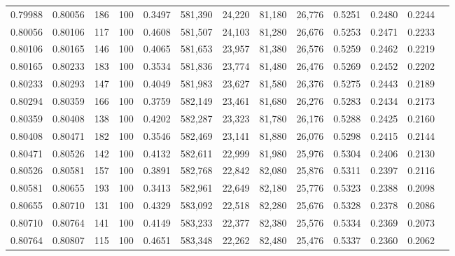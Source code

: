 \begin{tabular}{rrrrrrrrrrrrr}
0.79988 & 0.80056 &   186 & 100 &                                     0.3497 & 581,390 &  24,220 &  81,180 &  26,776 & 0.5251 & 0.2480 & 0.2244 \\
0.80056 & 0.80106 &   117 & 100 &                                     0.4608 & 581,507 &  24,103 &  81,280 &  26,676 & 0.5253 & 0.2471 & 0.2233 \\
0.80106 & 0.80165 &   146 & 100 &                                     0.4065 & 581,653 &  23,957 &  81,380 &  26,576 & 0.5259 & 0.2462 & 0.2219 \\
0.80165 & 0.80233 &   183 & 100 &                                     0.3534 & 581,836 &  23,774 &  81,480 &  26,476 & 0.5269 & 0.2452 & 0.2202 \\
0.80233 & 0.80293 &   147 & 100 &                                     0.4049 & 581,983 &  23,627 &  81,580 &  26,376 & 0.5275 & 0.2443 & 0.2189 \\
0.80294 & 0.80359 &   166 & 100 &                                     0.3759 & 582,149 &  23,461 &  81,680 &  26,276 & 0.5283 & 0.2434 & 0.2173 \\
0.80359 & 0.80408 &   138 & 100 &                                     0.4202 & 582,287 &  23,323 &  81,780 &  26,176 & 0.5288 & 0.2425 & 0.2160 \\
0.80408 & 0.80471 &   182 & 100 &                                     0.3546 & 582,469 &  23,141 &  81,880 &  26,076 & 0.5298 & 0.2415 & 0.2144 \\
0.80471 & 0.80526 &   142 & 100 &                                     0.4132 & 582,611 &  22,999 &  81,980 &  25,976 & 0.5304 & 0.2406 & 0.2130 \\
0.80526 & 0.80581 &   157 & 100 &                                     0.3891 & 582,768 &  22,842 &  82,080 &  25,876 & 0.5311 & 0.2397 & 0.2116 \\
0.80581 & 0.80655 &   193 & 100 &                                     0.3413 & 582,961 &  22,649 &  82,180 &  25,776 & 0.5323 & 0.2388 & 0.2098 \\
0.80655 & 0.80710 &   131 & 100 &                                     0.4329 & 583,092 &  22,518 &  82,280 &  25,676 & 0.5328 & 0.2378 & 0.2086 \\
0.80710 & 0.80764 &   141 & 100 &                                     0.4149 & 583,233 &  22,377 &  82,380 &  25,576 & 0.5334 & 0.2369 & 0.2073 \\
0.80764 & 0.80807 &   115 & 100 &                                     0.4651 & 583,348 &  22,262 &  82,480 &  25,476 & 0.5337 & 0.2360 & 0.2062 \\

\end{tabular}
